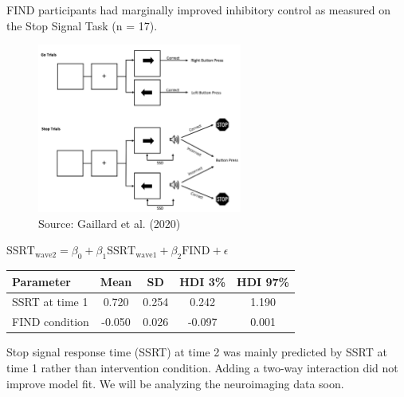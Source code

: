 \documentclass[final]{beamer}
\newlength{\colwidth}
\begin{document}
\begin{frame}[t]
\begin{columns}[t]
\begin{column}{\colwidth}
\begin{block}{FIND participants had marginally improved inhibitory control as measured on the Stop Signal Task (n = 17).}
    \begin{figure}[ht]
      \centering
      \includegraphics[clip, width=0.6\textwidth]{stopsignal.png}
        \\[0.5em]
        {\tiny Source: Gaillard et al. (2020)}
      \label{fig:stopsignal}
    \end{figure}

    \begin{tcolorbox}[colback=paloaltogreen, colframe=paloaltogreen, width=\linewidth]
     \color{white}
     $\text{SSRT}_{\text{wave2}} = \beta_0 + \beta_1 \text{SSRT}_{\text{wave1}} + \beta_2 \text{FIND} + \epsilon$
    \end{tcolorbox}
    
    \begin{table}[ht]
        \centering
        \fontsize{9}{11}\selectfont
          \begin{tabularx}{\textwidth}{l c c c c}
            \toprule
            \textbf{Parameter} & \textbf{Mean} & \textbf{SD} & \textbf{HDI 3\%} & \textbf{HDI 97\%} \\
            \midrule
            \rowcolor{yellow!50} SSRT at time 1 & 0.720 & 0.254 & 0.242 & 1.190 \\
            FIND condition & -0.050 & 0.026 & -0.097 & 0.001 \\
            \bottomrule
          \end{tabularx}
    \end{table}

    Stop signal response time (SSRT) at time 2 was mainly predicted by SSRT at time 1 rather than intervention condition. Adding a two-way interaction did not improve model fit. We will be analyzing the neuroimaging data soon.
    
  \end{block}
    \vspace{-0.25cm}


\end{column}
\end{columns}
\end{frame}
\end{document}
